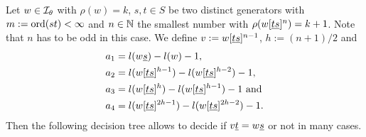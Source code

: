 \begin{prop}
	Let $w \in \mathcal{I}_{\theta}$ with $\rho(w) = k$, $s,t \in S$ be two distinct generators with $m := \operatorname{ord}(st) < \infty$ and $n \in \mathbb{N}$ the smallest number with $\rho(w[\underline{t} \underline{s}]^n) = k+1$. Note that $n$ has to be odd in this case. We define $v := w[\underline{t} \underline{s}]^{n-1}$, $h := (n+1)/2$ and
	\begin{align*}
		a_1 & = l(w \underline{s}) - l(w) - 1, \\
		a_2 & = l(w[\underline{t} \underline{s}]^{h-1}) - l(w[\underline{t} \underline{s}]^{h-2}) - 1, \\
		a_3 & = l(w[\underline{t} \underline{s}]^{h}) - l(w[\underline{t} \underline{s}]^{h-1}) - 1 \textrm{ and} \\
		a_4 & = l(w[\underline{t} \underline{s}]^{2h-1}) - l(w[\underline{t} \underline{s}]^{2h-2}) - 1.
	\end{align*}
	Then the following decision tree allows to decide if $v \underline{t} = w \underline{s}$ or not in many cases.


\end{prop}
